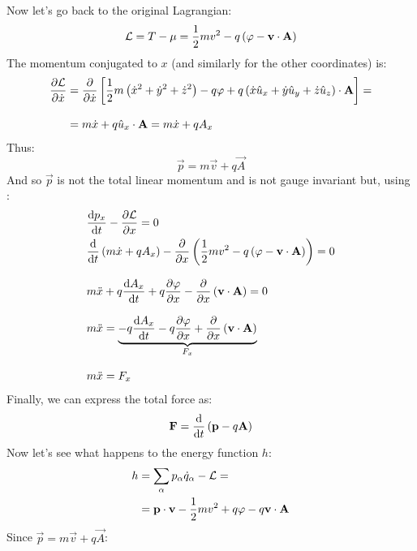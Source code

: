 Now let's go back to the original Lagrangian:
\begin{equation}
  \mathcal{L} = T - \mu = \dfrac{1}{2}mv^2 - q\left(\varphi - \vb{v} \cdot \vb{A}\right)
\end{equation}
The momentum conjugated to $x$ (and similarly for the other coordinates) is:
\begin{equation}
  \begin{split}
    \pdv{\lagr}{\dot{x}} &= \pdv{}{\dot{x}}\sqbr{\dfrac{1}{2}m\brackets{\dot{x}^2 + \dot{y}^2 + \dot{z}^2} - q\potE + q\brackets{\dot{x} \hat{u}_x + \dot{y} \hat{u}_y + \dot{z} \hat{u}_z} \cdot \vec{A}} =\\[8pt]
    &= m\dot{x} + q\hat{u}_x \cdot \vec{A} = m\dot{x} + qA_x
  \end{split}
\end{equation}
Thus:
\begin{equation}
  \vec{p} = m\vec{v} + q\vec{A}
\end{equation}
And so $\vec{p}$ is not the total linear momentum and is not gauge invariant but, using \eleref :
\begin{equation}
  \begin{split}
    &\dv{p_x}{t} - \pdv{\lagr}{x} = 0\\
    &\dv{}{t}\brackets{m\dot{x} + qA_x} - \pdv{}{x}\brackets{\dfrac{1}{2}mv^2 - q\brackets{\potE - \vec{v} \cdot \vec{A}}} = 0\\[8pt]
    &m\ddot{x} +q\dv{A_x}{t} + q\pdv{\potE}{x} - \pdv{}{x}\brackets{\vec{v} \cdot \vec{A}} = 0\\[8pt]
    &m\ddot{x} = \underbrace{-q\dv{A_x}{t} - q\pdv{\potE}{x} + \pdv{}{x}\brackets{\vec{v} \cdot \vec{A}}}_{F_x}\\[8pt]
    &m\ddot{x} = F_x
  \end{split}
\end{equation}
Finally, we can express the total force as:
\begin{equation}
  \vec{F} = \dv{}{t}\brackets{\vec{p} - q\vec{A}}
\end{equation}
Now let's see what happens to the energy function $h$:
\begin{equation}
  \begin{split}
    h &= \displaystyle\sum_{\alpha}p_{\alpha}\dot{q}_{\alpha} - \mathcal{L} =\\
    &= \vb{p} \cdot \vb{v} - \dfrac{1}{2}mv^2 +q\varphi - q\vb{v} \cdot \vb{A}
  \end{split}
\end{equation}
Since $\vec{p} = m\vec{v} + q\vec{A}$:
